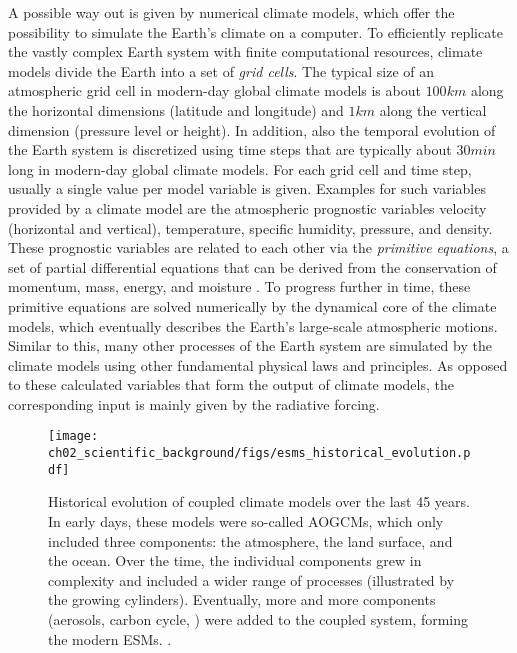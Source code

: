 A possible way out is given by numerical climate models, which offer the
possibility to simulate the Earth's climate on a computer. To efficiently
replicate the vastly complex Earth system with finite computational resources,
climate models divide the Earth into a set of \emph{grid cells}. The typical
size of an atmospheric grid cell in modern-day global climate models is about
$100 \unit{km}$ along the horizontal dimensions (latitude and longitude) and $1
\unit{km}$ along the vertical dimension (pressure level or height). In
addition, also the temporal evolution of the Earth system is discretized using
time steps that are typically about $30 \unit{min}$ long in modern-day global
climate models. For each grid cell and time step, usually a single value per
model variable is given. Examples for such variables provided by a climate
model are the atmospheric prognostic variables velocity (horizontal and
vertical), temperature, specific humidity, pressure, and density. These
prognostic variables are related to each other via the \emph{primitive
  equations}, a set of partial differential equations that can be derived from
the conservation of momentum, mass, energy, and moisture \autocite{Holton2004}.
To progress further in time, these primitive equations are solved numerically
by the dynamical core of the climate models, which eventually describes the
Earth's large-scale atmospheric motions. Similar to this, many other processes
of the Earth system are simulated by the climate models using other fundamental
physical laws and principles. As opposed to these calculated variables that
form the output of climate models, the corresponding input is mainly given by
the radiative forcing.

\begin{figure}[t]
  \centering
  \texttt{[image: 
    ch02\_scientific\_background/figs/esms\_historical\_evolution.pdf]}
  \caption[
    Historical evolution of coupled climate models over the last 45 years.
  ]{
    Historical evolution of coupled climate models over the last 45 years. In
    early days, these models were so-called \acfp{AOGCM}, which only included
    three components: the atmosphere, the land surface, and the ocean. Over the
    time, the individual components grew in complexity and included a wider
    range of processes (illustrated by the growing cylinders). Eventually, more
    and more components (aerosols, carbon cycle, \etc{}) were added to the
    coupled system, forming the modern \acfp{ESM}.
    .
  }
  \label{fig:02:esms_historical_evolution}
\end{figure}

